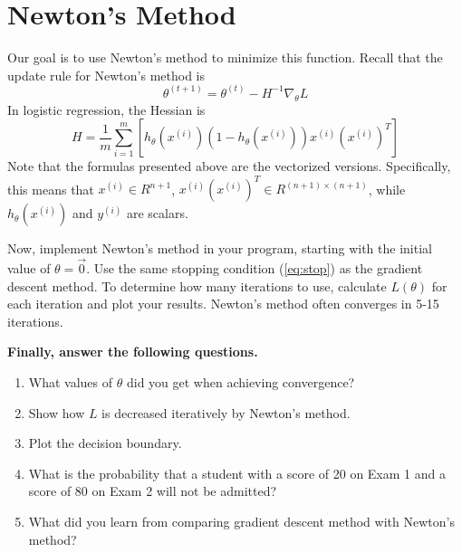 \documentclass[10pt,a4paper]{article}
\begin{document}
\section{Newton's Method}


  Our goal is to use Newton's method to minimize this function. Recall that the update rule for Newton's method is 
  \begin{equation}
    \theta^{(t+1)}=\theta^{(t)}-H^{-1}\nabla_{\theta}L \nonumber
  \end{equation}  
  In logistic regression, the Hessian is 
  \begin{equation}
    H = \frac{1}{m} \sum^m_{i=1} \left[ h_\theta(x^{(i)}) \left( 1 - h_\theta(x^{(i)}) \right) x^{(i)} \left(x^{(i)}\right)^T \right]
  \end{equation}  
  Note that the formulas presented above are the vectorized versions. Specifically, this means that $x^{(i)} \in R^{n+1}$, $ x^{(i)}\left(x^{(i)}\right)^{T}\in R^{(n+1) \times (n+1)}$, while $h_{\theta}(x^{(i)})$ and $y^{(i)}$ are scalars.


  Now, implement Newton's method in your program, starting with the initial value of  $\theta = \vec{0}$. Use the same stopping condition (\ref{eq:stop}) as the gradient descent method. To determine how many iterations to use, calculate $L(\theta)$ for each iteration and plot your results. Newton's method often converges in 5-15 iterations. 

  



  \textbf{Finally, answer the following questions.}
  \begin{enumerate}
    \item What values of $\theta$ did you get when achieving convergence?
    \item Show how $L$ is decreased iteratively by Newton's method.
    \item Plot the decision boundary. 
    \item What is the probability that a student with a score of 20 on Exam 1 and a score of 80 on Exam 2 will not be admitted?
    \item What did you learn from comparing gradient descent method with Newton's method?
  \end{enumerate}
\end{document}
